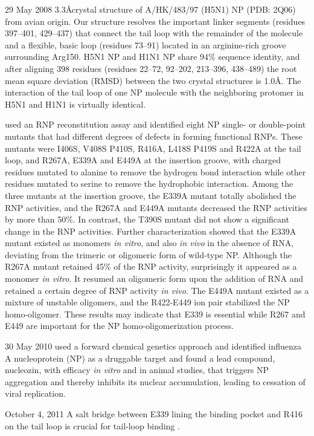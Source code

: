 29 May 2008 \citep{1231} 3.3\AA crystal structure of A/HK/483/97 (H5N1) NP (PDB: 2Q06) from avian origin. Our structure
resolves the important linker segments (residues 397–401, 429–437) that connect the tail loop with the remainder of the molecule and a flexible, basic loop (residues 73–91) located in an arginine-rich groove surrounding Arg150. H5N1 NP and H1N1 NP share 94\% sequence identity, and after aligning 398 residues (residues 22–72, 92–202, 213–396, 438–489) the root mean square deviation (RMSD) between the two crystal structures is 1.0\AA. The interaction of the tail loop of one NP molecule with the neighboring protomer in H5N1 and H1N1 is virtually identical.

\citep{1232} used an RNP reconstitution assay and identified eight NP single- or double-point mutants that had different degrees of defects in forming functional RNPs. These mutants were I406S, V408S P410S, R416A, L418S P419S and R422A at the tail loop, and R267A, E339A and E449A at the insertion groove, with charged residues mutated to alanine to remove the hydrogen bond interaction while other residues mutated to serine to remove the hydrophobic interaction. Among the three mutants at the insertion groove, the E339A mutant totally abolished the RNP activities, and the R267A and E449A mutants decreased the RNP activities by more than 50\%. In contrast, the T390S mutant did not show a significant change in the RNP activities. Further characterization showed that the E339A mutant existed as monomers \textit{in vitro}, and also \textit{in vivo} in the absence of RNA, deviating from the trimeric or oligomeric form of wild-type NP. Although the R267A mutant retained 45\% of the RNP activity, surprisingly it appeared as a monomer \textit{in vitro}. It resumed an oligomeric form upon the addition of RNA and retained a certain degree of RNP activity \textit{in vivo}. The E449A mutant existed as a mixture of unstable oligomers, and the R422-E449 ion pair stabilized the NP homo-oligomer. These results may indicate that E339 is essential while R267 and E449 are important for the NP homo-oligomerization process.%

30 May 2010 \citep{906} used a forward chemical genetics approach and identified influenza A nucleoprotein (NP) as a druggable target and found a lead compound, nucleozin, with efficacy \textit{in vitro} and in animal studies, that triggers NP aggregation and thereby inhibits its nuclear accumulation, leading to cessation of viral replication.

October 4, 2011 \citep{1233} A salt bridge between E339 lining the binding pocket and R416 on the tail loop is crucial for tail-loop binding \citep{1232,1233}. 

